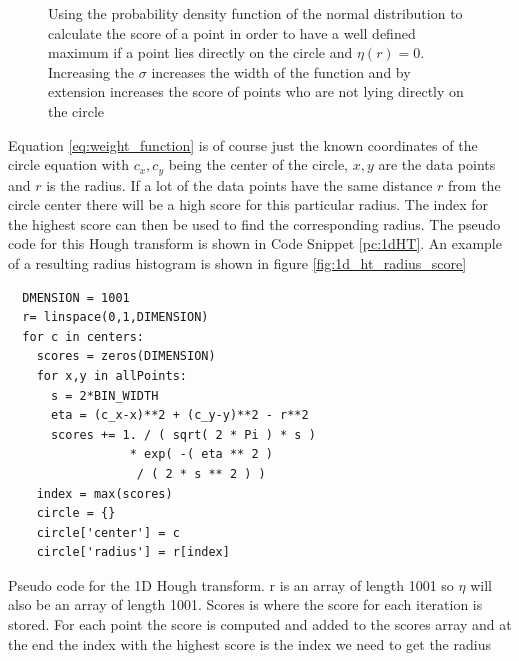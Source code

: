 \documentclass[11pt,twoside]{scrreprt}
\begin{document}
\begin{figure}[ht]
\centering
    \caption[Normal Distribution: Used as a weight function]{Using the probability density function of the normal distribution to 
    calculate the score of a point in order to have a well defined maximum if a point lies directly on the circle and $\eta(r) = 0$. 
    Increasing the $\sigma$ increases the width of the function and by extension increases the score of points who are not lying 
    directly on the circle}
  \label{fig:gauss}
\end{figure}
Equation \ref{eq:weight_function} is of course just the known coordinates of the circle equation with $c_x, c_y$ being the center of 
the circle, $x, y$ are the data points and $r$ is the radius. If a lot of the data points have the same distance $r$ from the circle 
center there will be a high score for this particular radius. The index for the highest score can then be used to find the 
corresponding radius. The pseudo code for this Hough transform is shown in Code Snippet \ref{pc:1dHT}. An example of a resulting radius
histogram is shown in figure \ref{fig:1d_ht_radius_score}

\begin{codesnippet}[htb]
  \begin{lstlisting}
  DMENSION = 1001
  r= linspace(0,1,DIMENSION)
  for c in centers:
    scores = zeros(DIMENSION)
    for x,y in allPoints:
      s = 2*BIN_WIDTH
      eta = (c_x-x)**2 + (c_y-y)**2 - r**2
      scores += 1. / ( sqrt( 2 * Pi ) * s ) 
                 * exp( -( eta ** 2 ) 
                  / ( 2 * s ** 2 ) )
    index = max(scores)
    circle = {}
    circle['center'] = c
    circle['radius'] = r[index]
\end{lstlisting}
\caption[Pseudo Code 1D HT]{Pseudo code for the 1D Hough transform. r is an array of length 1001 so $\eta$ will also be an 
array of length 1001. Scores is where the score for each iteration is stored. For each point the score is computed and added 
to the scores array and at the end the index with the highest score is the index we need to get the radius}\label{pc:1dHT}
\end{codesnippet}
\end{document}
